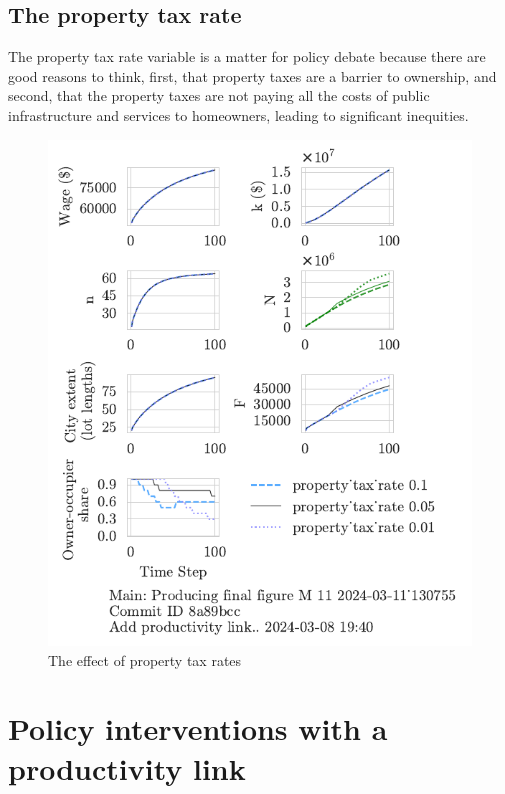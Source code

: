 \newpage
\subsection{The property tax rate}
The property tax rate variable is a matter for policy debate because there are good reasons to think, first, that property taxes are a barrier to ownership, and second, that the property taxes are not paying all the costs of public infrastructure and services to homeowners, leading to significant inequities.

\begin{figure}[h!tb]
    \centering
    \includegraphics[scale=1.1, trim={0 1.4cm 0 0},clip]{fig/property_tax_rate-Main-130755.pdf}
    \caption{The effect of property tax rates}
    \label{fig:property_tax_ownership_trajectory}
\end{figure}

\newpage
\section{Policy interventions with a productivity link}


